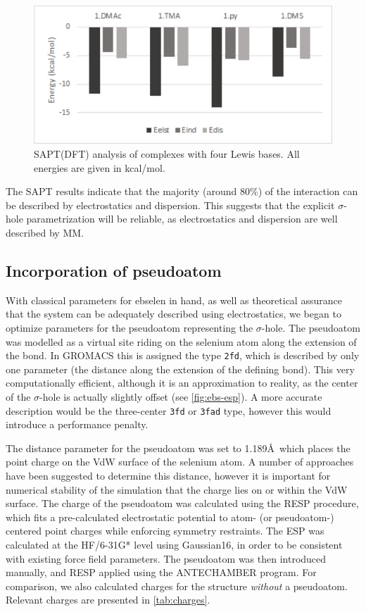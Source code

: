\begin{refsection}
\begin{figure}
    \centering
    \includegraphics[width=0.5\linewidth]{Figures/sapt-eda.pdf}
    \caption{SAPT(DFT) analysis of complexes with four Lewis bases. All energies are given in kcal/mol.}
    \label{fig:eda}
\end{figure}

The SAPT results indicate that the majority (around 80\%) of the interaction can be described by electrostatics and dispersion.
This suggests that the explicit $\sigma$-hole parametrization will be reliable, as electrostatics and dispersion are well described by MM.

\subsection{Incorporation of pseudoatom}
With classical parameters for ebselen in hand, as well as theoretical assurance that the system can be adequately described using electrostatics, we began to optimize parameters for the pseudoatom representing the $\sigma$-hole.
The pseudoatom was modelled as a virtual site riding on the selenium atom along the extension of the  bond.
In GROMACS this is assigned the type \texttt{2fd}, which is described by only one parameter (the distance along the extension of the defining bond).
This very computationally efficient, although it is an approximation to reality, as the center of the $\sigma$-hole is actually slightly offset (see \cref{fig:ebs-esp}).
A more accurate description would be the three-center \texttt{3fd} or \texttt{3fad} type, however this would introduce a performance penalty.

The distance parameter for the pseudoatom was set to 1.189\AA\ which places the point charge on the VdW surface of the selenium atom.
A number of approaches have been suggested to determine this distance, however it is important for numerical stability of the simulation that the charge lies on or within the VdW surface.\autocite{Hobza2012}
The charge of the pseudoatom was calculated using the RESP procedure, which fits a pre-calculated electrostatic potential to atom- (or pseudoatom-) centered point charges while enforcing symmetry restraints.
The ESP was calculated at the HF/6-31G* level using Gaussian16, in order to be consistent with existing force field parameters.
The pseudoatom was then introduced manually, and RESP applied using the ANTECHAMBER program.
For comparison, we also calculated charges for the structure \emph{without} a pseudoatom.
Relevant charges are presented in \cref{tab:charges}.


\end{refsection}
